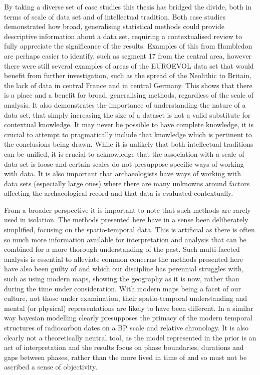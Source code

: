 By taking a diverse set of case studies this thesis has bridged the divide, both in terms of scale of data set and of intellectual tradition. Both case studies demonstrated how broad, generalising statistical methods could provide descriptive information about a data set, requiring a contextualised review to fully appreciate the significance of the results. Examples of this from Hambledon are perhaps easier to identify, such as segment 17 from the central area, however there were still several examples of areas of the EUROEVOL data set that would benefit from further investigation, such as the spread of the Neolithic to Britain, the lack of data in central France and in central Germany. This shows that there is a place and a benefit for broad, generalising methods, regardless of the scale of analysis. It also demonstrates the importance of understanding the nature of a data set, that simply increasing the size of a dataset is not a valid substitute for contextual knowledge. It may never be possible to have complete knowledge, it is crucial to attempt to pragmatically include that knowledge which is pertinent to the conclusions being drawn. While it is unlikely that both intellectual traditions can be unified, it is crucial to acknowledge that the association with a scale of data set is loose and certain scales do not presuppose specific ways of working with data. It is also important that archaeologists have ways of working with data sets (especially large ones) where there are many unknowns around factors affecting the archaeological record and that data is evaluated contextually.

From a broader perspective it is important to note that such methods are rarely used in isolation. The methods presented here have in a sense been deliberately simplified, focusing on the spatio-temporal data. This is artificial as there is often so much more information available for interpretation and analysis that can be combined for a more thorough understanding of the past. Such multi-faceted analysis is essential to alleviate common concerns the methods presented here have also been guilty of and which our discipline has perennial struggles with, such as using modern maps, showing the geography as it is now, rather than during the time under consideration. With modern maps being a facet of our culture, not those under examination, their spatio-temporal understanding and mental (or physical) representations are likely to have been different. In a similar way bayesian modelling clearly presupposes the primacy of the modern temporal structures of radiocarbon dates on a BP scale and relative chronology. It is also clearly not a theoretically neutral tool, as the model represented in the prior is an act of interpretation and the results focus on phase boundaries, durations and gaps between phases, rather than the more lived in time of \citet{Lucas:2005fk} and so must not be ascribed a sense of objectivity. 

